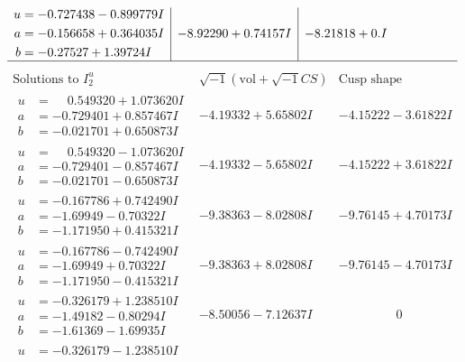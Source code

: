 \documentclass[1p]{elsarticle_modified}
\theoremstyle{definition}
\newcommand{\I}{\sqrt{-1}}
\begin{document}
$$\begin{array}{c|c|c}
\begin{aligned}
u &= -0.727438 - 0.899779 I \\
a &= -0.156658 + 0.364035 I \\
b &= -0.27527 + 1.39724 I\end{aligned}
 & -8.92290 + 0.74157 I & -8.21818 + 0. I\phantom{ +0.000000I}\\
 \hline 
 \end{array}$$\newpage$$\begin{array}{c|c|c}  
\text{Solutions to }I^u_{2}& \I (\text{vol} + \sqrt{-1}CS) & \text{Cusp shape}\\
 \hline 
\begin{aligned}
u &= \phantom{-}0.549320 + 1.073620 I \\
a &= -0.729401 + 0.857467 I \\
b &= -0.021701 + 0.650873 I\end{aligned}
 & -4.19332 + 5.65802 I & -4.15222 - 3.61822 I \\ \hline\begin{aligned}
u &= \phantom{-}0.549320 - 1.073620 I \\
a &= -0.729401 - 0.857467 I \\
b &= -0.021701 - 0.650873 I\end{aligned}
 & -4.19332 - 5.65802 I & -4.15222 + 3.61822 I \\ \hline\begin{aligned}
u &= -0.167786 + 0.742490 I \\
a &= -1.69949 - 0.70322 I \\
b &= -1.171950 + 0.415321 I\end{aligned}
 & -9.38363 - 8.02808 I & -9.76145 + 4.70173 I \\ \hline\begin{aligned}
u &= -0.167786 - 0.742490 I \\
a &= -1.69949 + 0.70322 I \\
b &= -1.171950 - 0.415321 I\end{aligned}
 & -9.38363 + 8.02808 I & -9.76145 - 4.70173 I \\ \hline\begin{aligned}
u &= -0.326179 + 1.238510 I \\
a &= -1.49182 - 0.80294 I \\
b &= -1.61369 - 1.69935 I\end{aligned}
 & -8.50056 - 7.12637 I & \phantom{-0.000000 } 0 \\ \hline\begin{aligned}
u &= -0.326179 - 1.238510 I \\

\end{aligned}
\end{array}$$
\end{document}
